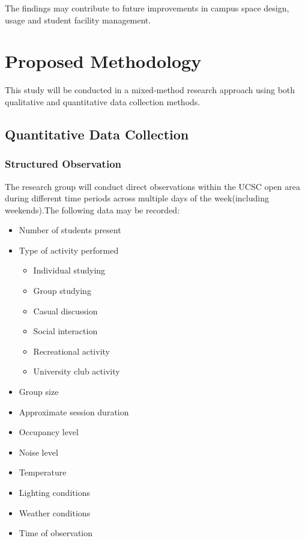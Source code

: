 \documentclass[12pt]{report}
\begin{document}
The findings may contribute to future improvements in campus space design, usage and student facility management.

\chapter{Proposed Methodology}

This study will be conducted in a mixed-method research approach using both qualitative and quantitative data collection methods.

\section{Quantitative Data Collection}

\subsection{Structured Observation}

The research group will conduct direct observations within the UCSC open area during different time periods across multiple days of the week(including weekends).The following data may be recorded:

\begin{itemize}
    \item Number of students present
    \item Type of activity performed
    \begin{itemize}
        \item Individual studying
        \item Group studying
        \item Casual discussion
        \item Social interaction
        \item Recreational activity
        \item University club activity
    \end{itemize}
    
    \item Group size
    \item Approximate session duration
    \item Occupancy level
    \item Noise level
    \item Temperature
    \item Lighting conditions
    \item Weather conditions
    \item Time of observation
\end{itemize}
\end{document}
